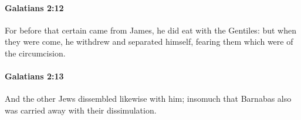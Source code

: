 		\paragraph{Galatians 2:12} %
			\label{GALATIANS-2-12}

			For before that certain came from James, he did eat with the Gentiles: but when they were come, he withdrew and separated himself, fearing them which were of the circumcision.

			\begin{framed}
			\scriptsize
				\begin{compactdesc}
					\item[SBLG] 
				\end{compactdesc}
			\end{framed}

		\paragraph{Galatians 2:13} %
			\label{GALATIANS-2-13}

			And the other Jews dissembled likewise with him; insomuch that Barnabas also was carried away with their dissimulation.

